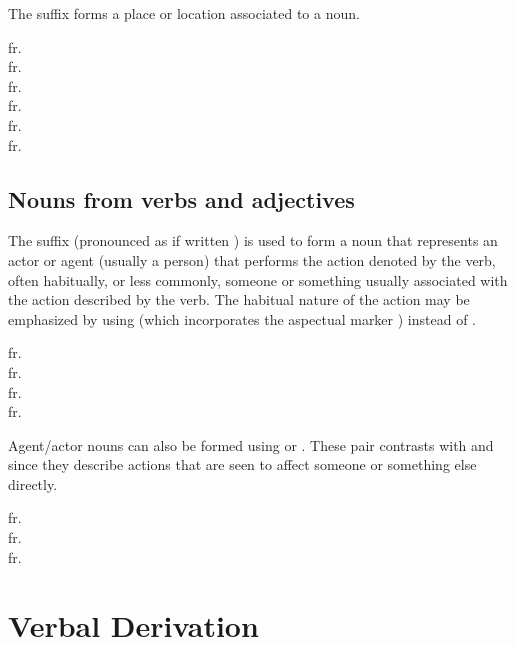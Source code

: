 The suffix  forms a place or location associated to a noun.

\ex
{} fr. \\
 fr. \\
 fr. \\
 fr. \\
 fr. \\
 fr. \\
\xe

\subsection{Nouns from verbs and adjectives}\label{sec:nomder-verb}

The suffix  (pronounced as if written ) is used to form a noun that represents an actor or agent (usually a person) that performs the action denoted by the verb, often habitually, or less commonly, someone or something usually associated with the action described by the verb. The habitual nature of the action may be emphasized by using  (which incorporates the aspectual marker ) instead of . 

\ex
{} fr. \\
 fr. \\
 fr. \\
 fr. \\
\xe

Agent/actor nouns can also be formed using  or . These pair contrasts with  and  since they describe actions that are seen to affect someone or something else directly.

\ex
{} fr. \\
 fr. \\
 fr. 
\xe

\section{Verbal Derivation}

